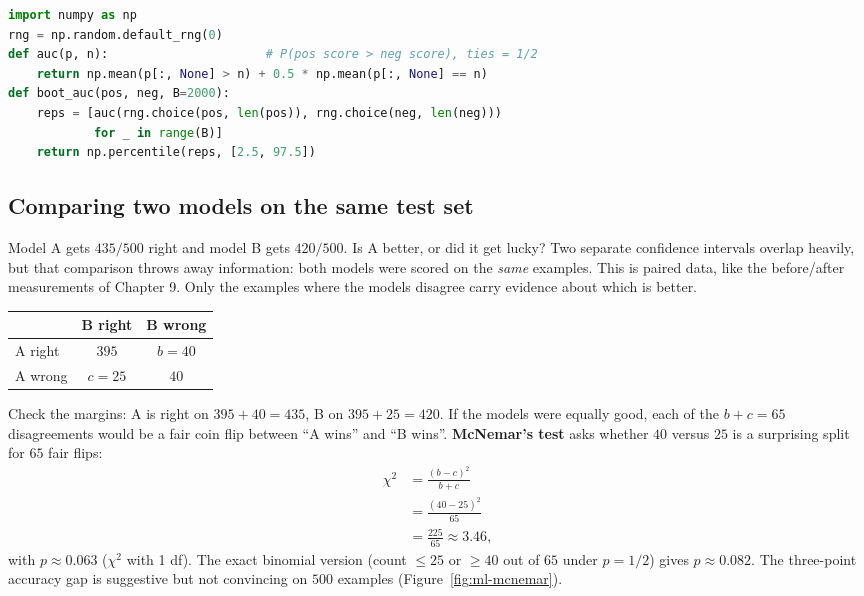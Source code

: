 \begin{lstlisting}[language=Python]
import numpy as np
rng = np.random.default_rng(0)
def auc(p, n):                      # P(pos score > neg score), ties = 1/2
    return np.mean(p[:, None] > n) + 0.5 * np.mean(p[:, None] == n)
def boot_auc(pos, neg, B=2000):
    reps = [auc(rng.choice(pos, len(pos)), rng.choice(neg, len(neg)))
            for _ in range(B)]
    return np.percentile(reps, [2.5, 97.5])
\end{lstlisting}

\subsection{Comparing two models on the same test set}

Model A gets $435/500$ right and model B gets $420/500$. Is A better, or did it get lucky? Two
separate confidence intervals overlap heavily, but that comparison throws away information:
both models were scored on the \emph{same} examples. This is paired data, like the
before/after measurements of Chapter 9. Only the examples where the models disagree carry
evidence about which is better.

\begin{center}
\begin{tabular}{lcc}
\toprule
& B right & B wrong \\
\midrule
A right & $395$ & $b=40$ \\
A wrong & $c=25$ & $40$ \\
\bottomrule
\end{tabular}
\end{center}

Check the margins: A is right on $395+40=435$, B on $395+25=420$. If the models were equally
good, each of the $b+c=65$ disagreements would be a fair coin flip between ``A wins'' and
``B wins''. \textbf{McNemar's test} asks whether $40$ versus $25$ is a surprising split for $65$
fair flips:
\begin{align*}
\chi^2 &= \frac{(b-c)^2}{b+c} \\
&= \frac{(40-25)^2}{65} \\
&= \frac{225}{65} \approx 3.46,
\end{align*}
with $p \approx 0.063$ ($\chi^2$ with 1 df).
The exact binomial version (count $\le 25$ or $\ge 40$ out of $65$ under $p=1/2$) gives
$p\approx0.082$. The three-point accuracy gap is suggestive but not convincing on $500$
examples (Figure~\ref{fig:ml-mcnemar}).


